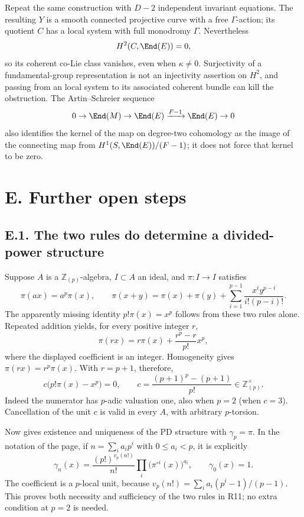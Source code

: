 \begin{remark}
Repeat the same construction with $D-2$ independent invariant equations.  The resulting $Y$ is a smooth connected projective curve with a free $\Gamma$-action; its quotient $C$ has a local system with full monodromy $\Gamma$.  Nevertheless
\[
 H^2(C,\End(E))=0,
\]
so its coherent co-Lie class vanishes, even when $\kappa\ne0$.  Surjectivity of a fundamental-group representation is not an injectivity assertion on $H^2$, and passing from an \etale local system to its associated coherent bundle can kill the obstruction.  The Artin--Schreier sequence
\[
 0\to\End(M)\to\End(E)\xrightarrow{F-1}\End(E)\to0
\]
also identifies the kernel of the map on degree-two cohomology as the image of the connecting map from $H^1(S,\End(E))/(F-1)$; it does not force that kernel to be zero.
\end{remark}

\section{E. Further open steps}
\subsection{E.1. The two rules do determine a divided-power structure}

Suppose $A$ is a $\mathbb Z_{(p)}$-algebra, $I\subset A$ an ideal, and $\pi:I\to I$ satisfies
\[
 \pi(ax)=a^p\pi(x),\qquad
 \pi(x+y)=\pi(x)+\pi(y)+\sum_{i=1}^{p-1}\frac{x^iy^{p-i}}{i!(p-i)!}.
\]
The apparently missing identity $p!\pi(x)=x^p$ follows from these two rules alone.  Repeated addition yields, for every positive integer $r$,
\[
 \pi(rx)=r\pi(x)+\frac{r^p-r}{p!}x^p,
\]
where the displayed coefficient is an integer.  Homogeneity gives $\pi(rx)=r^p\pi(x)$.  With $r=p+1$, therefore,
\[
 c\bigl(p!\pi(x)-x^p\bigr)=0,\qquad
 c=\frac{(p+1)^p-(p+1)}{p!}\in\mathbb Z_{(p)}^\times.
\]
Indeed the numerator has $p$-adic valuation one, also when $p=2$ (when $c=3$).  Cancellation of the unit $c$ is valid in every $A$, with arbitrary $p$-torsion.

Now \cite[Lemma~23.5.3, Tag~07GS]{StacksProject} gives existence and uniqueness of the PD structure with $\gamma_p=\pi$.  In the notation of the page, if $n=\sum_i a_ip^i$ with $0\leq a_i<p$, it is explicitly
\[
 \gamma_n(x)=\frac{(p!)^{v_p(n!)}}{n!}\prod_i\bigl(\pi^{\circ i}(x)\bigr)^{a_i},\qquad
 \gamma_0(x)=1.
\]
The coefficient is a $p$-local unit, because $v_p(n!)=\sum_i a_i(p^i-1)/(p-1)$.  This proves both necessity and sufficiency of the two rules in R11; no extra condition at $p=2$ is needed.

